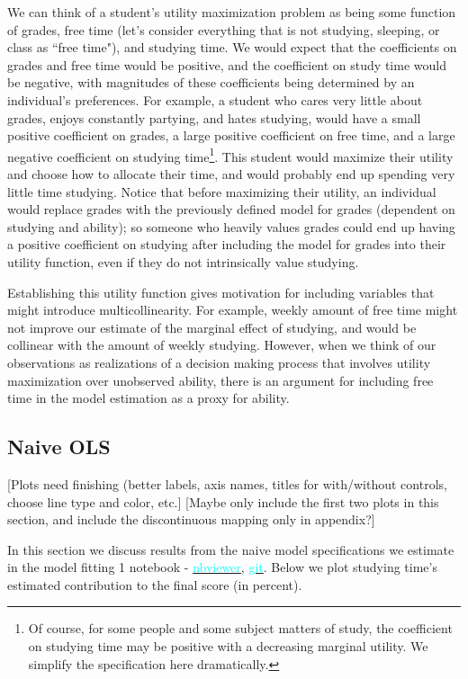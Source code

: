 \documentclass[12pt]{article}
\begin{document}
We can think of a student's utility maximization problem as being some function of grades, free time (let's consider everything that is not studying, sleeping, or class as ``free time"), and studying time. We would expect that the coefficients on grades and free time would be positive, and the coefficient on study time would be negative, with magnitudes of these coefficients being determined by an individual's preferences. For example, a student who cares very little about grades, enjoys constantly partying, and hates studying, would have a small positive coefficient on grades, a large positive coefficient on free time, and a large negative coefficient on studying time\footnote{Of course, for some people and some subject matters of study, the coefficient on studying time may be positive with a decreasing marginal utility. We simplify the specification here dramatically.}. This student would maximize their utility and choose how to allocate their time, and would probably end up spending very little time studying. Notice that before maximizing their utility, an individual would replace grades with the previously defined model for grades (dependent on studying and ability); so someone who heavily values grades could end up having a positive coefficient on studying after including the model for grades into their utility function, even if they do not intrinsically value studying.

Establishing this utility function gives motivation for including variables that might introduce multicollinearity. For example, weekly amount of free time might not improve our estimate of the marginal effect of studying, and would be collinear with the amount of weekly studying. However, when we think of our observations as realizations of a decision making process that involves utility maximization over unobserved ability, there is an argument for including free time in the model estimation as a proxy for ability.

\subsection{Naive OLS}
\textcolor{BrickRed}{[Plots need finishing (better labels, axis names, titles for with/without controls, choose line type and color, etc.]} \textcolor{BrickRed}{[Maybe only include the first two plots in this section, and include the discontinuous mapping only in appendix?]}

In this section we discuss results from the naive model specifications we estimate in the model fitting 1 notebook -  \href{https://nbviewer.jupyter.org/github/nadavtadelis/Reproducible_Metrics/blob/master/model_fitting_1.ipynb}{\textcolor{cyan}{nbviewer}}, \href{https://github.com/nadavtadelis/Reproducible_Metrics/blob/master/model_fitting_1.ipynb}{\textcolor{cyan}{git}}. Below we plot studying time's estimated contribution to the final score (in percent).
\end{document}
